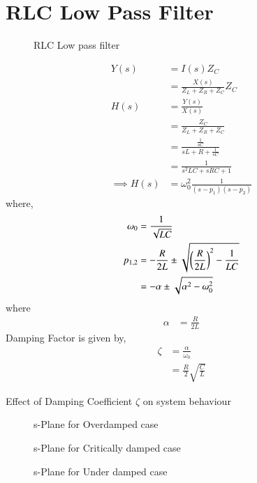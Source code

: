 \documentclass[journal,12pt,twocolumn]{IEEEtran}
\theoremstyle{remark}
\begin{document}
\section{RLC Low Pass Filter}
\begin{figure}[!ht]
    \centering
    
    \caption{RLC Low pass filter}
\end{figure}
\begin{align}
    Y(s) &= I(s)Z_C\\
    &= \frac{X(s)}{Z_L + Z_R + Z_C}Z_C\\
    H(s) &= \frac{Y(s)}{X(s)}\\
    &= \frac{Z_C}{Z_L + Z_R + Z_C}\\
    &= \frac{\frac{1}{sC}}{sL + R + \frac{1}{sC}}\\
    &= \frac{1}{s^2LC + sRC + 1}\\
    \implies H(s) &= \omega_0^2\frac{1}{(s-p_1)(s-p_2)}
\end{align}
where,
\begin{align}
    \omega_0 &= \frac{1}{\sqrt{LC}}\\
    p_{1, 2} &= -\frac{R}{2L} \pm \sqrt{\left(\frac{R}{2L}\right)^2 - \frac{1}{LC}}\\
    &= -\alpha \pm \sqrt{\alpha^2 - \omega_0^2}
\end{align}
where
\begin{align}
    \alpha &= \frac{R}{2L}
\end{align}
Damping Factor is given by,
\begin{align}
   \zeta &= \frac{\alpha}{\omega_0}\\
   &= \frac{R}{2}\sqrt{\frac{C}{L}}
\end{align}
\begin{table}[!ht]
    \centering
    
    \caption{Effect of Damping Coefficient $\zeta$ on system behaviour}
\end{table}
\begin{figure}[!ht]
    \centering
    
    \caption{s-Plane for Overdamped case}
\end{figure}
\begin{figure}[!ht]
    \centering
    
    \caption{s-Plane for Critically damped case}
\end{figure}
\begin{figure}[!ht]
    \centering
    
    \caption{s-Plane for Under damped case}
\end{figure}
\end{document}
